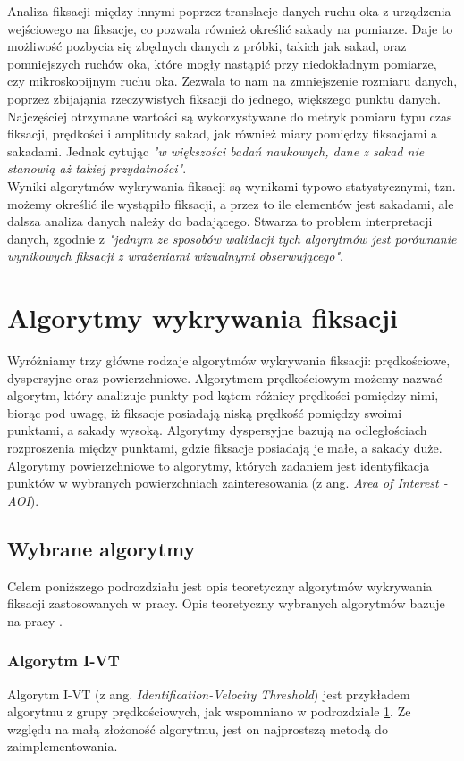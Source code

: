 Analiza fiksacji między innymi poprzez translacje danych ruchu oka z urządzenia wejściowego na fiksacje, co pozwala również określić sakady na pomiarze. Daje to możliwość pozbycia się zbędnych danych z próbki, takich jak sakad, oraz pomniejszych ruchów oka, które mogły nastąpić przy niedokładnym pomiarze, czy mikroskopijnym ruchu oka. Zezwala to nam na zmniejszenie rozmiaru danych, poprzez zbijająnia rzeczywistych fiksacji do jednego, większego punktu danych. Najczęściej otrzymane wartości są wykorzystywane do metryk pomiaru typu czas fiksacji, prędkości i amplitudy sakad, jak również miary pomiędzy fiksacjami a sakadami. Jednak cytując \cite{Main} \emph{"w większości badań naukowych, dane z sakad nie stanowią aż takiej przydatności"}.\\[\baselineskip]
Wyniki algorytmów wykrywania fiksacji są wynikami typowo statystycznymi, tzn. możemy określić ile wystąpiło fiksacji, a przez to ile elementów jest sakadami, ale dalsza analiza danych należy do badającego. Stwarza to problem interpretacji danych, zgodnie z \cite{Main} \emph{"jednym ze sposobów walidacji tych algorytmów jest porównanie wynikowych fiksacji z wrażeniami wizualnymi obserwującego"}.
\section{Algorytmy wykrywania fiksacji}
\label{ssec:num1}
Wyróżniamy trzy główne rodzaje algorytmów wykrywania fiksacji: prędkościowe, dyspersyjne oraz powierzchniowe. Algorytmem prędkościowym możemy nazwać algorytm, który analizuje punkty pod kątem różnicy prędkości pomiędzy nimi, biorąc pod uwagę, iż fiksacje posiadają niską prędkość pomiędzy swoimi punktami, a sakady wysoką. Algorytmy dyspersyjne bazują na odległościach rozproszenia między punktami, gdzie fiksacje posiadają je małe, a sakady duże. Algorytmy powierzchniowe to algorytmy, których zadaniem jest identyfikacja punktów w wybranych powierzchniach zainteresowania (z ang. \textit{Area of Interest - AOI}).
\subsection{Wybrane algorytmy}
Celem poniższego podrozdziału jest opis teoretyczny algorytmów wykrywania fiksacji zastosowanych w pracy. Opis teoretyczny wybranych algorytmów bazuje na pracy \cite{Main}.
\subsubsection{Algorytm I-VT}
Algorytm I-VT (z ang. \emph{Identification-Velocity Threshold}) jest przykładem algorytmu z grupy prędkościowych, jak wspomniano w podrozdziale \ref{ssec:num1}. Ze względu na małą złożoność algorytmu, jest on najprostszą metodą do zaimplementowania.\\

